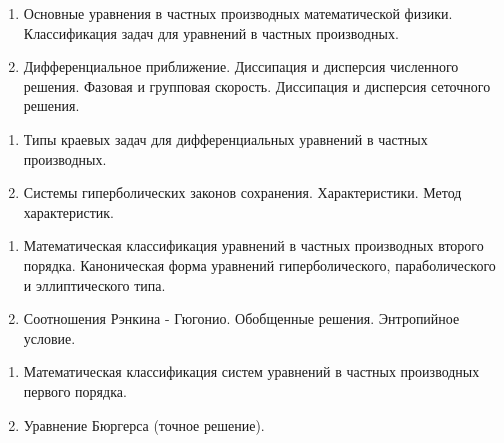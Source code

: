 \documentclass[14pt,a4paper]{extarticle}
\author{Губкин Алексей Сергеевич}
\begin{document}

    \begin{enumerate}

        \item Основные уравнения в частных производных математической физики. Классификация задач для уравнений в частных производных.

        \item Дифференциальное приближение. Диссипация и дисперсия численного решения. Фазовая и групповая скорость. Диссипация и дисперсия сеточного решения.

    \end{enumerate}


    \begin{enumerate}

        \item Типы краевых задач для дифференциальных уравнений в частных производных.

        \item Системы гиперболических законов сохранения. Характеристики. Метод характеристик.

    \end{enumerate}


    \begin{enumerate}

        \item Математическая классификация уравнений в частных производных второго порядка. Каноническая форма уравнений гиперболического, параболического и эллиптического типа.

        \item Соотношения Рэнкина - Гюгонио. Обобщенные решения. Энтропийное условие.

    \end{enumerate}


    \begin{enumerate}

        \item Математическая классификация систем уравнений в частных производных первого порядка.

        \item Уравнение Бюргерса (точное решение).

    \end{enumerate}
\end{document}
